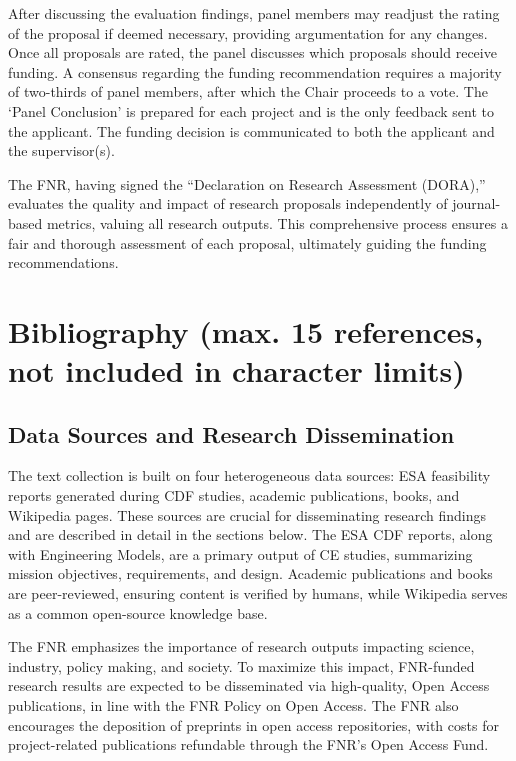 \documentclass[12pt]{article}
\begin{document}
After discussing the evaluation findings, panel members may readjust the rating of the proposal if deemed necessary, providing argumentation for any changes. Once all proposals are rated, the panel discusses which proposals should receive funding. A consensus regarding the funding recommendation requires a majority of two-thirds of panel members, after which the Chair proceeds to a vote. The ‘Panel Conclusion’ is prepared for each project and is the only feedback sent to the applicant. The funding decision is communicated to both the applicant and the supervisor(s).

The FNR, having signed the “Declaration on Research Assessment (DORA),” evaluates the quality and impact of research proposals independently of journal-based metrics, valuing all research outputs. This comprehensive process ensures a fair and thorough assessment of each proposal, ultimately guiding the funding recommendations.

\section{Bibliography (max. 15 references, not included in character limits)}

\subsection{Data Sources and Research Dissemination}

The text collection is built on four heterogeneous data sources: ESA feasibility reports generated during CDF studies, academic publications, books, and Wikipedia pages. These sources are crucial for disseminating research findings and are described in detail in the sections below. The ESA CDF reports, along with Engineering Models, are a primary output of CE studies, summarizing mission objectives, requirements, and design. Academic publications and books are peer-reviewed, ensuring content is verified by humans, while Wikipedia serves as a common open-source knowledge base.

The FNR emphasizes the importance of research outputs impacting science, industry, policy making, and society. To maximize this impact, FNR-funded research results are expected to be disseminated via high-quality, Open Access publications, in line with the FNR Policy on Open Access. The FNR also encourages the deposition of preprints in open access repositories, with costs for project-related publications refundable through the FNR’s Open Access Fund.
\end{document}
